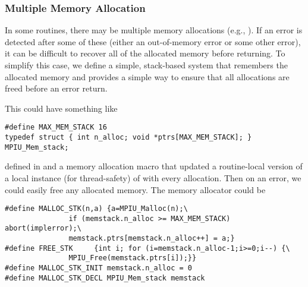 \documentclass{article}
\begin{document}

\subsubsection{Multiple Memory Allocation}
In some routines, there may be multiple memory allocations (e.g.,
).  If an error is 
detected after some of these (either an out-of-memory error or some other
error), it can be difficult to recover all of the allocated memory before
returning.  To simplify this case, we define a simple, stack-based system that
remembers the allocated memory and provides a simple way to ensure that all
allocations are freed before an error return.


This could have something like
\begin{verbatim}
#define MAX_MEM_STACK 16
typedef struct { int n_alloc; void *ptrs[MAX_MEM_STACK]; } MPIU_Mem_stack;
\end{verbatim}
defined in  
and a memory allocation macro that updated a routine-local version of a
local instance (for thread-safety) of  
with every allocation.  Then on an error, we could easily free any allocated
memory.  The memory allocator could be
\begin{verbatim}
#define MALLOC_STK(n,a) {a=MPIU_Malloc(n);\
               if (memstack.n_alloc >= MAX_MEM_STACK) abort(implerror);\
               memstack.ptrs[memstack.n_alloc++] = a;}
#define FREE_STK     {int i; for (i=memstack.n_alloc-1;i>=0;i--) {\
               MPIU_Free(memstack.ptrs[i]);}}
#define MALLOC_STK_INIT memstack.n_alloc = 0
#define MALLOC_STK_DECL MPIU_Mem_stack memstack
\end{verbatim}

\end{document}
